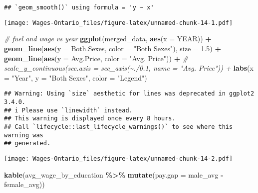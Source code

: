 \documentclass[
]{article}
\newenvironment{Shaded}{\begin{snugshade}}{\end{snugshade}}
\newcommand{\AttributeTok}[1]{\textcolor[rgb]{0.13,0.29,0.53}{#1}}
\newcommand{\CommentTok}[1]{\textcolor[rgb]{0.56,0.35,0.01}{\textit{#1}}}
\newcommand{\FloatTok}[1]{\textcolor[rgb]{0.00,0.00,0.81}{#1}}
\newcommand{\FunctionTok}[1]{\textcolor[rgb]{0.13,0.29,0.53}{\textbf{#1}}}
\newcommand{\NormalTok}[1]{#1}
\newcommand{\SpecialCharTok}[1]{\textcolor[rgb]{0.81,0.36,0.00}{\textbf{#1}}}
\newcommand{\StringTok}[1]{\textcolor[rgb]{0.31,0.60,0.02}{#1}}
\begin{document}
\begin{verbatim}
## `geom_smooth()` using formula = 'y ~ x'
\end{verbatim}

\texttt{[image: Wages-Ontario\_files/figure-latex/unnamed-chunk-14-1.pdf]}

\begin{Shaded}
\begin{Highlighting}[]
\CommentTok{\# fuel and wage vs year}
\FunctionTok{ggplot}\NormalTok{(merged\_data, }\FunctionTok{aes}\NormalTok{(}\AttributeTok{x =}\NormalTok{ YEAR)) }\SpecialCharTok{+}
  \FunctionTok{geom\_line}\NormalTok{(}\FunctionTok{aes}\NormalTok{(}\AttributeTok{y =}\NormalTok{ Both.Sexes, }\AttributeTok{color =} \StringTok{"Both Sexes"}\NormalTok{), }\AttributeTok{size =} \FloatTok{1.5}\NormalTok{) }\SpecialCharTok{+}
  \FunctionTok{geom\_line}\NormalTok{(}\FunctionTok{aes}\NormalTok{(}\AttributeTok{y =}\NormalTok{ Avg.Price, }\AttributeTok{color =} \StringTok{"Avg. Price"}\NormalTok{)) }\SpecialCharTok{+}
  \CommentTok{\# scale\_y\_continuous(sec.axis = sec\_axis(\textasciitilde{}./0.1, name = "Avg. Price")) +}
  \FunctionTok{labs}\NormalTok{(}\AttributeTok{x =} \StringTok{"Year"}\NormalTok{, }\AttributeTok{y =} \StringTok{"Both Sexes"}\NormalTok{, }\AttributeTok{color =} \StringTok{"Legend"}\NormalTok{)}
\end{Highlighting}
\end{Shaded}

\begin{verbatim}
## Warning: Using `size` aesthetic for lines was deprecated in ggplot2 3.4.0.
## i Please use `linewidth` instead.
## This warning is displayed once every 8 hours.
## Call `lifecycle::last_lifecycle_warnings()` to see where this warning was
## generated.
\end{verbatim}

\texttt{[image: Wages-Ontario\_files/figure-latex/unnamed-chunk-14-2.pdf]}

\begin{Shaded}
\begin{Highlighting}[]
\FunctionTok{kable}\NormalTok{(avg\_wage\_by\_education }\SpecialCharTok{\%\textgreater{}\%}
  \FunctionTok{mutate}\NormalTok{(}\AttributeTok{pay.gap =}\NormalTok{ male\_avg }\SpecialCharTok{{-}}\NormalTok{ female\_avg))}
\end{Highlighting}
\end{Shaded}
\end{document}
